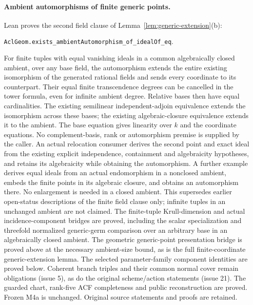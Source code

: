 \documentclass[11pt,oneside]{article}
\theoremstyle{definition}
\theoremstyle{remark}
\begin{document}
\paragraph{Ambient automorphisms of finite generic points.}
Lean proves the second field clause of Lemma~\ref{lem:generic-extension}(b):
\par\noindent
\texttt{AclGeom.exists\_ambientAutomorphism\_of\_idealOf\_eq}.
\par\noindent
For finite tuples with equal vanishing ideals in a common algebraically
closed ambient, over any base field, the automorphism extends the entire
existing isomorphism of the generated rational fields and sends every
coordinate to its counterpart. Their equal finite transcendence degrees
can be cancelled in the tower formula, even for infinite ambient degree.
Relative bases then have equal cardinalities. The existing semilinear
independent-adjoin equivalence extends the isomorphism across these bases;
the existing algebraic-closure equivalence extends it to the ambient.
The base equation gives linearity over $k$ and the coordinate equations.
No complement-basis, rank or automorphism premise is supplied by the caller.
An actual relocation consumer derives the second point and exact ideal
from the existing explicit independence, containment and algebraicity
hypotheses, and retains its algebraicity while obtaining the automorphism.
A further example derives equal ideals from an actual endomorphism in a
nonclosed ambient, embeds the finite points in its algebraic closure, and
obtains an automorphism there. No enlargement is needed in a closed ambient.
This supersedes earlier open-status descriptions of the finite field
clause only; infinite tuples in an unchanged ambient are not claimed.
The finite-tuple Krull-dimension and actual incidence-component bridges
are proved, including the scalar specialization and threefold normalized
generic-germ comparison over an arbitrary base in an algebraically closed
ambient. The geometric generic-point presentation bridge is proved above at
the necessary ambient-size bound, as is the full finite-coordinate
generic-extension lemma. The selected parameter-family component identities
are proved below. Coherent branch triples and their common normal cover
remain obligations (issue 5), as do the original scheme/action statements (issue 21). The guarded
chart, rank-five ACF completeness and public reconstruction are proved. Frozen M4a is unchanged. Original source statements and proofs are retained.

\clearpage
\end{document}
